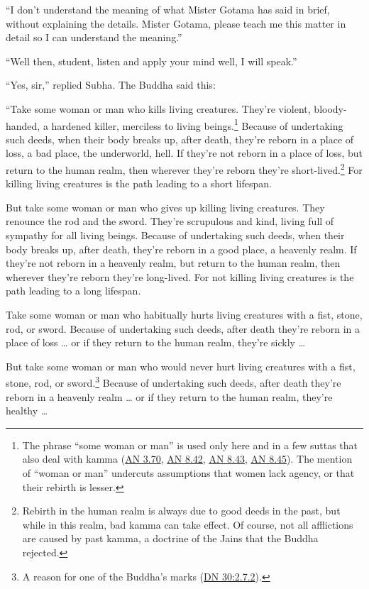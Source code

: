 \documentclass[12pt,openany]{book}%
\begin{document}
“I don’t understand the meaning of what Mister Gotama has said in brief, without explaining the details. Mister Gotama, please teach me this matter in detail so I can understand the meaning.” 

“Well then, student, listen and apply your mind well, I will speak.” 

“Yes, sir,” replied Subha. The Buddha said this: 

“Take some woman or man who kills living creatures. They’re violent, bloody-handed, a hardened killer, merciless to living beings.\footnote{The phrase “some woman or man” is used only here and in a few suttas that also deal with kamma (\href{https://suttacentral.net/an3.70/en/sujato}{AN 3.70}, \href{https://suttacentral.net/an8.42/en/sujato}{AN 8.42}, \href{https://suttacentral.net/an8.43/en/sujato}{AN 8.43}, \href{https://suttacentral.net/an8.45/en/sujato}{AN 8.45}). The mention of “woman or man” undercuts assumptions that women lack agency, or that their rebirth is lesser. } Because of undertaking such deeds, when their body breaks up, after death, they’re reborn in a place of loss, a bad place, the underworld, hell. If they’re not reborn in a place of loss, but return to the human realm, then wherever they’re reborn they’re short-lived.\footnote{Rebirth in the human realm is always due to good deeds in the past, but while in this realm, bad kamma can take effect. Of course, not all afflictions are caused by past kamma, a doctrine of the Jains that the Buddha rejected. } For killing living creatures is the path leading to a short lifespan. 

But take some woman or man who gives up killing living creatures. They renounce the rod and the sword. They’re scrupulous and kind, living full of sympathy for all living beings. Because of undertaking such deeds, when their body breaks up, after death, they’re reborn in a good place, a heavenly realm. If they’re not reborn in a heavenly realm, but return to the human realm, then wherever they’re reborn they’re long-lived. For not killing living creatures is the path leading to a long lifespan. 

Take some woman or man who habitually hurts living creatures with a fist, stone, rod, or sword. Because of undertaking such deeds, after death they’re reborn in a place of loss … or if they return to the human realm, they’re sickly … 

But take some woman or man who would never hurt living creatures with a fist, stone, rod, or sword.\footnote{A reason for one of the Buddha’s marks (\href{https://suttacentral.net/dn30/en/sujato\#2.7.2}{DN 30:2.7.2}). } Because of undertaking such deeds, after death they’re reborn in a heavenly realm … or if they return to the human realm, they’re healthy … 
\end{document}
